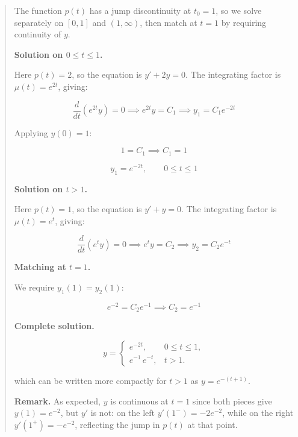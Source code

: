 \begin{quote}
\begin{respuesta}
The function $p(t)$ has a jump discontinuity at $t_0 = 1$, so we solve separately on
$[0,1]$ and $(1,\infty)$, then match at $t = 1$ by requiring continuity of $y$.

\textbf{Solution on $0 \le t \le 1$.}

Here $p(t) = 2$, so the equation is $y' + 2y = 0$. The integrating factor is
$\mu(t) = e^{2t}$, giving:

\[
\frac{d}{dt}\left(e^{2t}y\right) = 0 \implies e^{2t}y = C_1 \implies y_1 = C_1 e^{-2t}
\]

Applying $y(0) = 1$:

\[
1 = C_1 \implies C_1 = 1
\]

\[
y_1 = e^{-2t}, \qquad 0 \le t \le 1
\]

\textbf{Solution on $t > 1$.}

Here $p(t) = 1$, so the equation is $y' + y = 0$. The integrating factor is
$\mu(t) = e^{t}$, giving:

\[
\frac{d}{dt}\left(e^{t}y\right) = 0 \implies e^{t}y = C_2 \implies y_2 = C_2 e^{-t}
\]

\textbf{Matching at $t = 1$.}

We require $y_1(1) = y_2(1)$:

\[
e^{-2} = C_2 e^{-1} \implies C_2 = e^{-1}
\]

\textbf{Complete solution.}

\[
\boxed{y = \begin{cases} e^{-2t}, & 0 \le t \le 1, \\[6pt] e^{-1}\,e^{-t}, & t > 1. \end{cases}}
\]

which can be written more compactly for $t > 1$ as $y = e^{-(t+1)}$.

\textbf{Remark.} As expected, $y$ is continuous at $t=1$ since both pieces give
$y(1) = e^{-2}$, but $y'$ is not: on the left $y'(1^-) = -2e^{-2}$, while on the
right $y'(1^+) = -e^{-2}$, reflecting the jump in $p(t)$ at that point.

\end{respuesta}









\end{quote}



